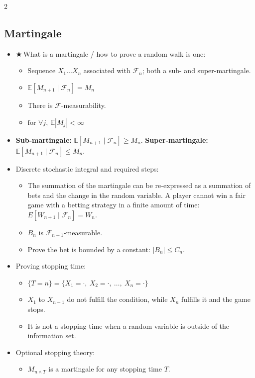 \documentclass[8pt,letterpaper]{extarticle}
\newcommand{\cs}{{\color{red!75!black}$\bigstar$}\,} %
\begin{document}
\begin{multicols}{2}
\subsection{Martingale}
\begin{itemize}
  \item \cs What is a martingale / how to prove a random walk is one:
    \begin{itemize}
      \item Sequence $X_1\dots X_n$ associated with $\mathcal{F}_n$; both a sub- and super-martingale.
      \item $\mathbb{E}[M_{n+1}\mid\mathcal{F}_n]=M_n$
      \item There is $\mathcal{F}$-measurability.
      \item $\text{for }\forall j,\ \mathbb{E}|M_j|<\infty$
    \end{itemize}
  \item \textbf{Sub-martingale:} $\mathbb{E}[M_{n+1}\mid\mathcal{F}_n]\ge M_n$. \textbf{Super-martingale:} $\mathbb{E}[M_{n+1}\mid\mathcal{F}_n]\le M_n$.
  \item Discrete stochastic integral and required steps:
    \begin{itemize}
      \item The summation of the martingale can be re-expressed as a summation of bets and the change in the random variable. A player cannot win a fair game with a betting strategy in a finite amount of time: $E[W_{n+1}\mid\mathcal{F}_n]=W_n$.
      \item $B_n$ is $\mathcal{F}_{n-1}$-measurable.
      \item Prove the bet is bounded by a constant: $|B_n|\le C_n$.
    \end{itemize}
  \item Proving stopping time:
    \begin{itemize}
      \item $\{T=n\}=\{X_1=\cdot,\ X_2=\cdot,\ \dots,\ X_n=\cdot\}$
      \item $X_1$ to $X_{n-1}$ do not fulfill the condition, while $X_n$ fulfills it and the game stops.
      \item It is not a stopping time when a random variable is outside of the information set.
    \end{itemize}
  \item Optional stopping theory:
    \begin{itemize}
      \item $M_{n\wedge T}$ is a martingale for any stopping time $T$.

\end{itemize}
\end{itemize}
\end{multicols}
\end{document}
